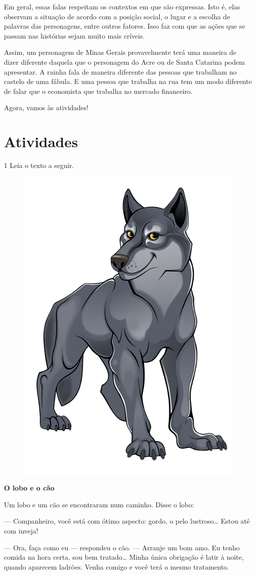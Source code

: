 \begin{conteudo}
\begin{conteudo}
\begin{conteudo}
\begin{conteudo}
{Em geral, essas falas respeitam os contextos em que são expressas.
Isto é, elas observam a situação de acordo com a posição social,
o lugar e a escolha de palavras das personagens, entre outros fatores. 
Isso faz com que as ações que se passam nas histórias sejam muito mais críveis.

Assim, um personagem de Minas Gerais provavelmente terá uma maneira
de dizer diferente daquela que o personagem do Acre ou de Santa Catarina podem apresentar.
A rainha fala de maneira diferente das pessoas que trabalham no castelo
de uma fábula. E uma pessoa que trabalha na rua tem um modo diferente de 
falar que o economista que trabalha no mercado financeiro.

Agora, vamos às atividades!
}

\section*{Atividades}

\num{1} Leia o texto a seguir.


\begin{myquote}
\begin{figure}
\includegraphics[width=.3\textwidth]{media/image22.png}
\end{figure}

\textbf{O lobo e o cão}

Um lobo e um cão se encontraram num caminho. Disse o lobo:

--- Companheiro, você está com ótimo aspecto: gordo, o pelo
lustroso\ldots{} Estou até com inveja!

--- Ora, faça como eu --- respondeu o cão. --- Arranje um bom amo. Eu
tenho comida na hora certa, sou bem tratado\ldots{} Minha única
obrigação é latir à noite, quando aparecem ladrões. Venha comigo e você
terá o mesmo tratamento.


\end{myquote}
\end{conteudo}
\end{conteudo}
\end{conteudo}
\end{conteudo}

